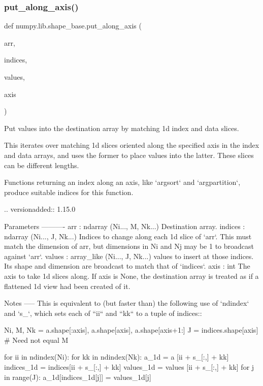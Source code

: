 \subsubsection{\texorpdfstring{put\+\_\+along\+\_\+axis()}{put\_along\_axis()}}
{\footnotesize\ttfamily def numpy.\+lib.\+shape\+\_\+base.\+put\+\_\+along\+\_\+axis (\begin{DoxyParamCaption}\item[{}]{arr,  }\item[{}]{indices,  }\item[{}]{values,  }\item[{}]{axis }\end{DoxyParamCaption})}

\begin{DoxyVerb}Put values into the destination array by matching 1d index and data slices.

This iterates over matching 1d slices oriented along the specified axis in
the index and data arrays, and uses the former to place values into the
latter. These slices can be different lengths.

Functions returning an index along an axis, like `argsort` and
`argpartition`, produce suitable indices for this function.

.. versionadded:: 1.15.0

Parameters
----------
arr : ndarray (Ni..., M, Nk...)
    Destination array.
indices : ndarray (Ni..., J, Nk...)
    Indices to change along each 1d slice of `arr`. This must match the
    dimension of arr, but dimensions in Ni and Nj may be 1 to broadcast
    against `arr`.
values : array_like (Ni..., J, Nk...)
    values to insert at those indices. Its shape and dimension are
    broadcast to match that of `indices`.
axis : int
    The axis to take 1d slices along. If axis is None, the destination
    array is treated as if a flattened 1d view had been created of it.

Notes
-----
This is equivalent to (but faster than) the following use of `ndindex` and
`s_`, which sets each of ``ii`` and ``kk`` to a tuple of indices::

    Ni, M, Nk = a.shape[:axis], a.shape[axis], a.shape[axis+1:]
    J = indices.shape[axis]  # Need not equal M

    for ii in ndindex(Ni):
        for kk in ndindex(Nk):
            a_1d       = a      [ii + s_[:,] + kk]
            indices_1d = indices[ii + s_[:,] + kk]
            values_1d  = values [ii + s_[:,] + kk]
            for j in range(J):
                a_1d[indices_1d[j]] = values_1d[j]


\end{DoxyVerb}
